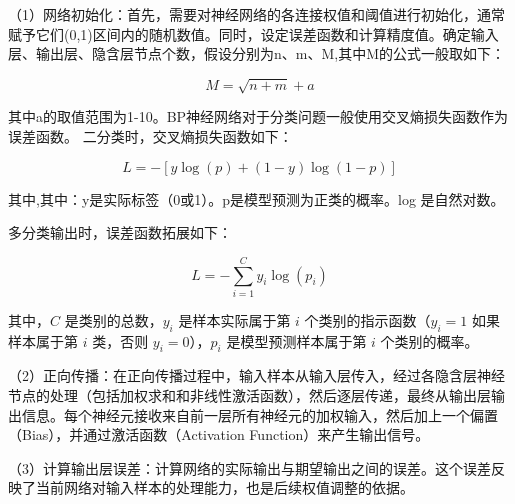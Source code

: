 （1）网络初始化：首先，需要对神经网络的各连接权值和阈值进行初始化，通常赋予它们(0,1)区间内的随机数值。同时，设定误差函数和计算精度值。确定输入层、输出层、隐含层节点个数，假设分别为n、m、M,其中M的公式一般取如下：

\begin{equation}
	M = \sqrt{n+m} + a 
\end{equation}

其中a的取值范围为1-10。BP神经网络对于分类问题一般使用交叉熵损失函数作为误差函数。
二分类时，交叉熵损失函数如下：

\begin{equation}
	L = -\left[y \log(p) + (1 - y) \log(1 - p)\right]
\end{equation}

其中,其中：y是实际标签（0或1）。p是模型预测为正类的概率。log 是自然对数。

多分类输出时，误差函数拓展如下：

\begin{equation}
L = -\sum_{i=1}^{C} y_i \log(p_i)
\end{equation}

其中，$C$ 是类别的总数，$y_i$ 是样本实际属于第 $i$ 个类别的指示函数（$y_i = 1$ 如果样本属于第 $i$ 类，否则 $y_i = 0$），$p_i$ 是模型预测样本属于第 $i$ 个类别的概率。


（2）正向传播：在正向传播过程中，输入样本从输入层传入，经过各隐含层神经节点的处理（包括加权求和和非线性激活函数），然后逐层传递，最终从输出层输出信息。每个神经元接收来自前一层所有神经元的加权输入，然后加上一个偏置（Bias），并通过激活函数（Activation Function）来产生输出信号。

\iffalse
这个过程可以用以下数学公式表示：
对于隐藏层的神经元：

\begin{equation}
net_{j} = \sum_{i} w_{ij} x_{i} + b_{j}netj​=i∑​wij​xi​+bj​
out_{j} = f(net_{j})outj​=f(netj​)
\end{equation}

对于输出层的神经元：
\begin{equation}
net_{k} = sum_{j} w_{jk} out_{j} + b_{k}netk​=sumj​wjk​outj​+bk​
out_{k} = f(net_{k})outk​=f(netk​)
\end{equation}
其中 $w_{ij}wij​$ 是输入层第 ii 个神经元到隐藏层第 jj 个神经元的权重，$w_{jk}wjk​$是隐藏层第 jj 个神经元到输出层第 kk 个神经元的权重；$b_{j}bj​$ 和 $b_{k}bk​$ 分别是隐藏层和输出层的偏置；$f(cdot)f(cdot)$ 是激活函数，常用的激活函数包括 Sigmoid、Tanh、ReLU 等。
\fi

（3）计算输出层误差：计算网络的实际输出与期望输出之间的误差。这个误差反映了当前网络对输入样本的处理能力，也是后续权值调整的依据。

